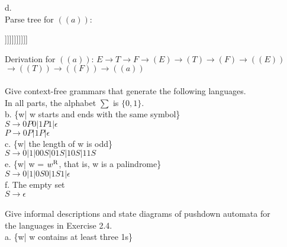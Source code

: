 \documentclass[12pt]{article}
\begin{document}
\noindent
d. \\
\noindent
Parse tree for $((a))$: \\
\begin{center}
	\begin{forest}
		[E [T [F [(E) [(T) [(F) [((E)) [((T)) [((F)) [a]]]]]]]]]]]
	\end{forest}
\end{center}

\noindent
Derivation for $((a))$:  $E \rightarrow T \rightarrow F \rightarrow (E) \rightarrow (T) \rightarrow (F) \rightarrow ((E)) $  \\
$ \rightarrow ((T)) \rightarrow ((F)) \rightarrow ((a)) $ \\


 \\
Give context-free grammars that generate the following languages. \\
In all parts, the alphabet $\sum$ is $\{0,1\}$. \\

\noindent
b. \{w| w starts and ends with the same symbol\} \\
$ S \rightarrow 0P0|1P1| \epsilon $ \\
$ P \rightarrow 0P|1P| \epsilon $ \\

\noindent
c. \{w| the length of w is odd\} \\
$ S \rightarrow 0|1|00S|01S|10S|11S $ \\

\noindent
e. \{w| w = $w\textsuperscript{R}$, that is, w is a palindrome\} \\
$ S \rightarrow 0|1|0S0|1S1| \epsilon $ \\

\noindent
f. The empty set \\
$ S \rightarrow \epsilon $ \\


 \\
Give informal descriptions and state diagrams of pushdown automata for \\
the languages in Exercise 2.4. \\

\noindent
a. \{w| w contains at least three 1s\}\\
\end{document}
